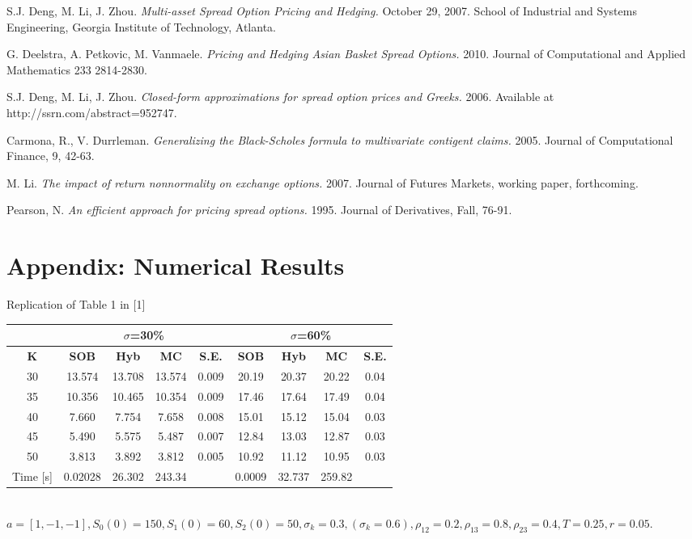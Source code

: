 \documentclass[a4paper]{article}
\begin{document}
\newpage
\begin{thebibliography}{1}
S.J. Deng, M. Li, J. Zhou.
\textit{Multi-asset Spread Option Pricing and Hedging.}
October 29, 2007. School of Industrial and Systems Engineering, Georgia Institute of Technology, Atlanta.

G. Deelstra, A. Petkovic, M. Vanmaele.
\textit{Pricing and Hedging Asian Basket Spread Options.}
2010. Journal of Computational and Applied Mathematics 233 2814-2830.

S.J. Deng, M. Li,  J. Zhou. 
\textit{Closed-form approximations for spread option prices and Greeks.} 2006.
Available at http://ssrn.com/abstract=952747.

Carmona, R., V. Durrleman. 
\textit{Generalizing the Black-Scholes formula to multivariate contigent claims.} 2005. Journal of Computational Finance, 9, 42-63.

M. Li.
\textit{The impact of return nonnormality on exchange options.} 2007.
Journal of Futures Markets, working paper, forthcoming.

Pearson, N. 
\textit{An efficient approach for pricing spread options.} 1995. Journal of Derivatives, Fall, 76-91.

\end{thebibliography}

\newpage
\section*{Appendix: Numerical Results}
\label{sec:appendix}

\captionsetup{skip=0pt}
\begin {table}[H]
\caption {Replication of Table 1 in [1]} 
\begin{center}
\begin{tabular}{c|c c c c|c c c c}
\hline
\multicolumn{1}{c|}{} & \multicolumn{4}{|c|}{$\sigma$=30\%} & \multicolumn{4}{|c}{$\sigma$=60\%} \\ 
\hline
  \textbf{K} & \textbf{SOB} & \textbf{Hyb}	& \textbf{MC} & \textbf{S.E.} & \textbf{SOB} & \textbf{Hyb} & \textbf{MC} & \textbf{S.E.}\\
  30 &	13.574 & 13.708 & 13.574 & 0.009 &  20.19 & 20.37  & 20.22 & 0.04 \\
  35 & 10.356 & 10.465 & 10.354 & 0.009 & 17.46  & 17.64 &17.49 & 0.04  \\
 40 & 7.660 & 7.754 & 7.658 & 0.008 & 15.01  & 15.12  & 15.04 & 0.03  \\
 45 & 5.490 & 5.575 & 5.487  & 0.007 & 12.84  &13.03  &12.87  & 0.03\\
 50 & 3.813 & 3.892 & 3.812  & 0.005 & 10.92  & 11.12 &10.95  &0.03 \\
\hline
Time [s] & 0.02028 & 26.302 & 243.34 & & 0.0009&  32.737 & 259.82 & \\
\hline
\end{tabular}
\\[8pt]
\caption*{$a=[1,-1,-1], S_0(0)=150, S_1(0) = 60, S_2(0) = 50, \sigma_k = 0.3, (\sigma_k = 0.6),\rho_{12} = 0.2, \rho_{13} = 0.8, \rho_{23} = 0.4, T = 0.25, r=0.05.$}
\end{center}
\end{table}
\end{document}
